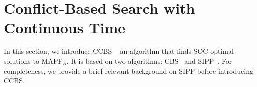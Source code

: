 \documentclass[review]{elsarticle}
\newcommand\konstantin[1]{\nb{\textbf{Konstantin:}}{red}{#1}}
\newcommand\roni[1]{\nb{\textbf{Roni:}}{green}{#1}}
\newcommand{\ccbs}{\ac{CCBS}\xspace}
\newcommand{\cbs}{\ac{CBS}\xspace}
\newcommand{\sipp}{\ac{SIPP}\xspace}
\newcommand{\mapfr}{\ac{MAPF}$_R$\xspace}
\begin{document}





\section{Conflict-Based Search with Continuous Time}
\label{sec:ccbs}
In this section, we introduce \ccbs{} -- an algorithm that finds SOC-optimal solutions to  \mapfr. 
It is based on two algorithms: \cbs~\cite{sharon2015conflict} and \sipp~\cite{phillips2011sipp}. 
For completeness, we provide a brief relevant background on \sipp before introducing \ccbs. 
\end{document}

